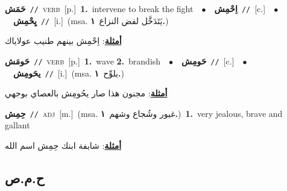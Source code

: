 \documentclass[10pt,a4paper,twoside]{article} %
\begin{document}
\begin{multicols}{2}
{\setlength\topsep{0pt}\textbf{\foreignlanguage{arabic}{حَمَش}}\ {\color{gray}\texttt{//}\color{black}}\ \textsc{verb}\ [p.]\ \textbf{1.}~intervene to break the fight\ \ $\bullet$\ \ \setlength\topsep{0pt}\textbf{\foreignlanguage{arabic}{اِحْمِش}}\ {\color{gray}\texttt{//}\color{black}}\ [c.]\ \ $\bullet$\ \ \setlength\topsep{0pt}\textbf{\foreignlanguage{arabic}{يِحْمِش}}\ {\color{gray}\texttt{//}\color{black}}\ [i.]\ \color{gray}(msa. \foreignlanguage{arabic}{يَتَدَخَّل لفض النزاع}~\foreignlanguage{arabic}{\textbf{١.}})\color{black}\  \begin{flushright}\color{gray}\foreignlanguage{arabic}{\textbf{\underline{\foreignlanguage{arabic}{أمثلة}}}: اِحْمِش بينهم طنيب عولاياك}\end{flushright}\color{black}} \vspace{2mm}

{\setlength\topsep{0pt}\textbf{\foreignlanguage{arabic}{حَومَش}}\ {\color{gray}\texttt{//}\color{black}}\ \textsc{verb}\ [p.]\ \textbf{1.}~wave  \textbf{2.}~brandish\ \ $\bullet$\ \ \setlength\topsep{0pt}\textbf{\foreignlanguage{arabic}{حَومِش}}\ {\color{gray}\texttt{//}\color{black}}\ [c.]\ \ $\bullet$\ \ \setlength\topsep{0pt}\textbf{\foreignlanguage{arabic}{يحَومِش}}\ {\color{gray}\texttt{//}\color{black}}\ [i.]\ \color{gray}(msa. \foreignlanguage{arabic}{يلوِّح}~\foreignlanguage{arabic}{\textbf{١.}})\color{black}\  \begin{flushright}\color{gray}\foreignlanguage{arabic}{\textbf{\underline{\foreignlanguage{arabic}{أمثلة}}}: مجنون هذا صار يحُومِش بالعصاي بوجهي}\end{flushright}\color{black}} \vspace{2mm}

{\setlength\topsep{0pt}\textbf{\foreignlanguage{arabic}{حِمِش}}\ {\color{gray}\texttt{//}\color{black}}\ \textsc{adj}\ [m.]\ \color{gray}(msa. \foreignlanguage{arabic}{غيور وشُجاع وشهم}~\foreignlanguage{arabic}{\textbf{١.}})\color{black}\ \textbf{1.}~very jealous, brave and gallant\  \begin{flushright}\color{gray}\foreignlanguage{arabic}{\textbf{\underline{\foreignlanguage{arabic}{أمثلة}}}: شايفة ابنك حِمِش اسم الله}\end{flushright}\color{black}} \vspace{2mm}

\vspace{-3mm}
\subsection*{\color{blue}\foreignlanguage{arabic}{ح.م.ص}\color{blue}{}} 


\end{multicols}
\end{document}

